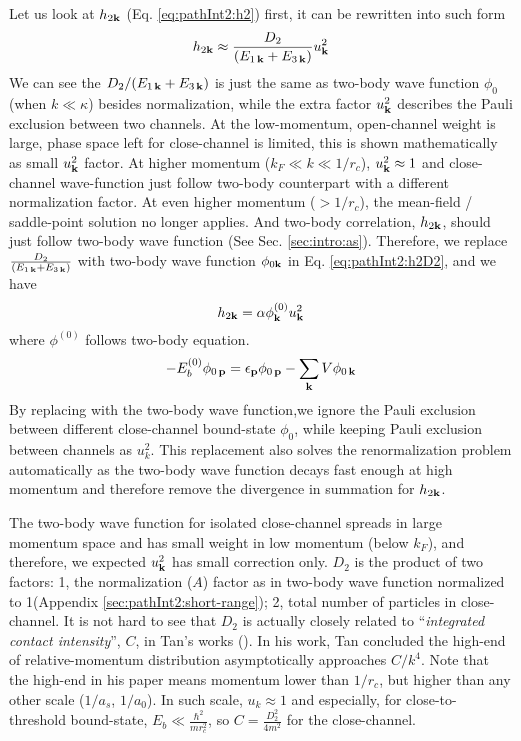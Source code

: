 Let us look at $h_{2\mathbf{k}}$ (Eq. \ref{eq:pathInt2:h2}) first, it can be rewritten into such form
\begin{equation}\label{eq:pathInt2:h2D2}
 h_{2\mathbf{k}}\approx\frac{D_{2}}{(E_{1\,\mathbf{k}}+E_{3\,\mathbf{k}})}u_{\mathbf{k}}^{2}
\end{equation}
We can see the ${D_{2}}/{(E_{1\,\mathbf{k}}+E_{3\,\mathbf{k}})}$ is just the same as two-body wave function $\phi_{0}$ (when $k\ll\kappa$) besides normalization, while the extra factor $u_{\mathbf{k}}^{2}$ describes the Pauli exclusion between two channels.  At the low-momentum, open-channel weight is large, phase space left for close-channel is limited, this is shown mathematically as small $u_{\mathbf{k}}^{2}$ factor.   At higher momentum ($k_{F}\ll{k}\ll1/r_{c}$), $u_{\mathbf{k}}^{2}\approx1$ and close-channel wave-function just follow two-body counterpart with a different normalization factor.   At even higher momentum ($>1/r_{c}$), the mean-field / saddle-point solution no longer applies.  And  two-body correlation, $h_{2\mathbf{k}}$, should just follow two-body wave function (See Sec. \ref{sec:intro:as}).  Therefore, we replace $\frac{D_{2}}{(E_{1\,\mathbf{k}}+E_{3\,\mathbf{k}})}$ with two-body wave function $\phi_{0\mathbf{k}}$ in Eq. \ref{eq:pathInt2:h2D2}, and we have 
\begin{equation}\label{eq:pathInt2:hphi}
h_{2\mathbf{k}}=\alpha\phi^{(0)}_{\mathbf{k}}u_{\mathbf{k}}^{2}
\end{equation}
where $\phi^{(0)}$ follows two-body \sch equation.
\begin{equation}\label{eq:pathInt2:phi}
-E_{b}^{(0)}\phi_{0\,\mathbf{p}}=\epsilon_{\mathbf{p}}\phi_{0\,\mathbf{p}}-\sum_{\mathbf{k}}V \phi_{0\,\mathbf{k}}
\end{equation}
By replacing with the two-body wave function,we ignore the Pauli exclusion between different close-channel bound-state $\phi_{0}$, while keeping Pauli exclusion between channels as $u_{k}^{2}$.
This replacement also solves the renormalization problem automatically as the two-body wave function decays fast enough at high momentum and therefore remove the divergence in summation for $h_{2\mathbf{k}}$.  


The two-body wave function for isolated close-channel spreads in large momentum space and has small weight in low momentum (below $k_{F}$), and therefore, we expected $u_{\mathbf{k}}^{2}$ has small correction only.  $D_{2}$ is the product of two factors: 1, the normalization ($A$) factor as in two-body wave function normalized to 1(Appendix \ref{sec:pathInt2:short-range}); 2, total number of particles in close-channel.  
It is not hard to see that $D_{2}$ is actually closely related to ``\emph{integrated contact intensity}'', $C$, in Tan's works (\cite{Tan2008-1,Tan2008-2}).  In his work, Tan concluded  the high-end of relative-momentum distribution asymptotically approaches  $C/k^{4}$.  Note that the high-end in his paper means momentum lower than $1/r_{c}$, but higher than any other scale ($1/a_{s}$, $1/a_{0}$).  In such scale, $u_{k}\approx1$ and especially, for close-to-threshold bound-state, $E_{b}\ll{}\frac{\hbar^{2}}{mr_{c}^{2}}$, so $C=\frac{D_{2}^{2}}{4m^{2}}$ for the close-channel.   

